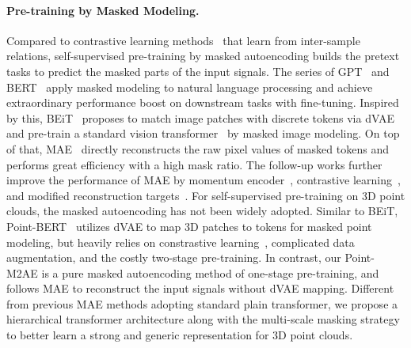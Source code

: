\documentclass{article}
\begin{document}
\paragraph{Pre-training by Masked Modeling.}
Compared to contrastive learning methods~\cite{he2020momentum,chen2020simple,chen2021exploring} that learn from inter-sample relations, self-supervised pre-training by masked autoencoding builds the pretext tasks to predict the masked parts of the input signals. The series of GPT~\cite{gpt1,gpt2,gpt3} and BERT~\cite{devlin2018bert} apply masked modeling to natural language processing and achieve extraordinary performance boost on downstream tasks with fine-tuning. Inspired by this, BEiT~\cite{bao2021beit} proposes to match image patches with discrete tokens via dVAE~\cite{dvae} and pre-train a standard vision transformer~\cite{vit,pointbert} by masked image modeling. On top of that, MAE~\cite{mae} directly reconstructs the raw pixel values of masked tokens and performs great efficiency with a high mask ratio. The follow-up works further improve the performance of MAE by momentum encoder~\cite{zhou2021ibot}, contrastive learning~\cite{baevski2022data2vec}, and modified reconstruction targets~\cite{wei2021masked}. For self-supervised pre-training on 3D point clouds, the masked autoencoding has not been widely adopted. Similar to BEiT, Point-BERT~\cite{pointbert} utilizes dVAE to map 3D patches to tokens for masked point modeling, but heavily relies on constrastive learning~\cite{he2020momentum}, complicated data augmentation, and the costly two-stage pre-training. In contrast, our Point-M2AE is a pure masked autoencoding method of one-stage pre-training, and follows MAE to reconstruct the input signals without dVAE mapping. Different from previous MAE methods adopting standard plain transformer, we propose a hierarchical transformer architecture along with the multi-scale masking strategy to better learn a strong and generic representation for 3D point clouds.
\end{document}
